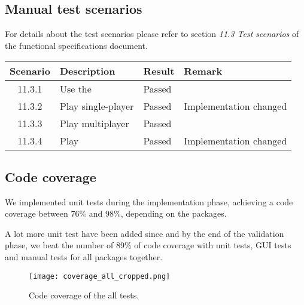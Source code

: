 \subsection{Manual test scenarios}

For details about the test scenarios please refer to section \emph{11.3 Test scenarios} of the functional specifications document.\par

\begin{tabular}{clll}

\hline
	\textbf{Scenario} & \textbf{Description} & \textbf{Result} & \textbf{Remark} \\
	\hline
	11.3.1 & Use the \gameexplorer & Passed & \\
	11.3.2 & Play \graphcoloring single-player & Passed & Implementation changed \footnotemark \\
	11.3.3 & Play \graphcoloring multiplayer & Passed & \\
	11.3.4 & Play \twixt & Passed & Implementation changed \footnotemark \\
	\hline
\end{tabular}


\pagebreak
\subsection{Code coverage}
We implemented unit tests during the implementation phase, achieving a code coverage between 76\% and 98\%, depending on the packages.\par
A lot more unit test have been added since and by the end of the validation phase, we beat the number of 89\% of code coverage with unit tests, GUI tests and manual tests for all packages together.\par

\begin{figure}[!h]
	\centering
	\texttt{[image: coverage\_all\_cropped.png]}
	\caption{Code coverage of the all tests.}
	\label{img:codeCoverage}
\end{figure}
